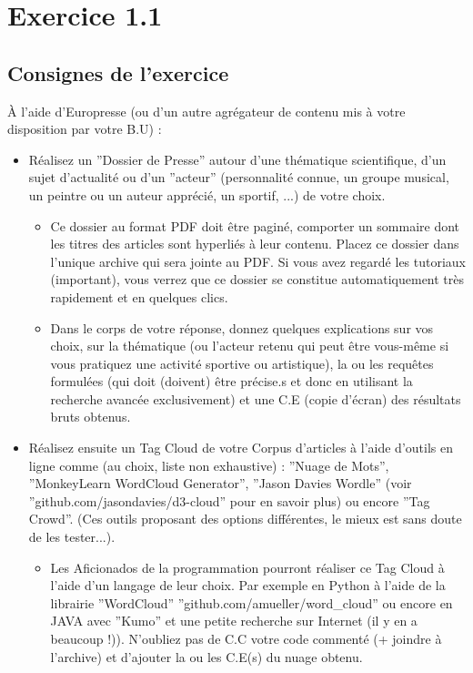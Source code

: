 \section{Exercice 1.1}
\subsection{Consignes de l'exercice}
\begin{tcb-instructions}[title=Exercice 1.1]
À l’aide d’Europresse (ou d’un autre agrégateur de contenu mis à votre disposition
par votre B.U) :

    \begin{itemize}[label=\checkmark]
        \item Réalisez un ”Dossier de Presse” autour d’une thématique scientifique, d’un sujet d’actualité ou d’un ”acteur” (personnalité connue, un groupe musical, un peintre ou un auteur apprécié, un sportif, ...) de votre choix.

           \begin{itemize}
                \item Ce dossier au format PDF doit être paginé, comporter un sommaire dont les titres des articles sont hyperliés à leur contenu. Placez ce dossier dans l’unique archive qui sera jointe au PDF. Si vous avez regardé les tutoriaux (important), vous verrez que ce dossier se constitue automatiquement très rapidement et en quelques clics.
                \item Dans le corps de votre réponse, donnez quelques explications sur vos choix, sur la thématique (ou l’acteur retenu qui peut être vous-même si vous pratiquez une activité sportive ou artistique), la ou les requêtes formulées (qui doit (doivent) être précise.s et donc en utilisant la recherche avancée exclusivement) et une C.E (copie d’écran) des résultats bruts obtenus.
            \end{itemize}

        \item Réalisez ensuite un Tag Cloud de votre Corpus d’articles à l’aide d’outils en ligne comme (au choix, liste non exhaustive) : ”Nuage de Mots”, ”MonkeyLearn WordCloud Generator”, ”Jason Davies Wordle” (voir ”github.com/jasondavies/d3-cloud” pour en savoir plus) ou encore ”Tag Crowd”. (Ces outils proposant des options différentes, le mieux est sans doute de les tester...).

            \begin{itemize}
                \item Les Aficionados de la programmation pourront réaliser ce Tag Cloud à l’aide d’un langage de leur choix. Par exemple en Python à l’aide de la librairie ”WordCloud” ”github.com/amueller/word\_cloud” ou encore en JAVA avec ”Kumo” et une petite recherche sur Internet (il y en a beaucoup !)). N’oubliez pas de C.C votre code commenté (+ joindre à l’archive) et d’ajouter la ou les C.E(s) du nuage obtenu.
            \end{itemize}


\end{itemize}
\end{tcb-instructions}
